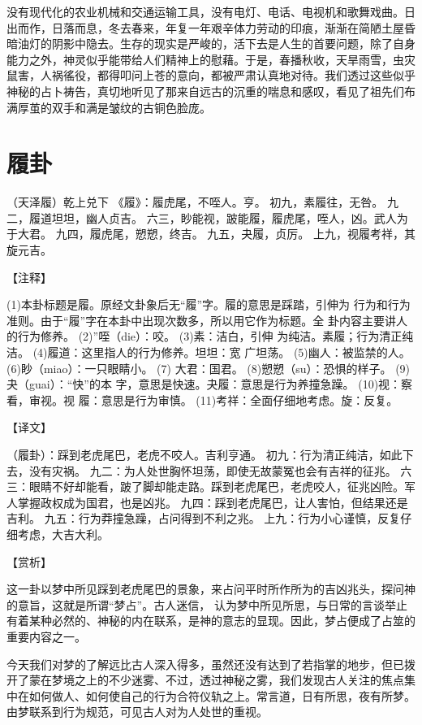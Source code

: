 \documentclass[a4paper,12pt,UTF8,twoside]{ctexbook}
\begin{document}
没有现代化的农业机械和交通运输工具，没有电灯、电话、电视机和歌舞戏曲。日出而作，日落而息，冬去春来，年复一年艰辛体力劳动的印痕，渐渐在简陋土屋昏暗油灯的阴影中隐去。生存的现实是严峻的，活下去是人生的首要问题，除了自身能力之外，神灵似乎能带给人们精神上的慰藉。于是，春播秋收，天旱雨雪，虫灾鼠害，人祸徭役，都得叩问上苍的意向，都被严肃认真地对待。我们透过这些似乎神秘的占卜祷告，真切地听见了那来自远古的沉重的喘息和感叹，看见了祖先们布满厚茧的双手和满是皱纹的古铜色脸庞。

\chapter{履卦}

（天泽履）乾上兑下
《履》：履虎尾，不咥人。亨。
初九，素履往，无咎。
九二，履道坦坦，幽人贞吉。
六三，眇能视，跛能履，履虎尾，咥人，凶。武人为于大君。
九四，履虎尾，愬愬，终吉。
九五，夬履，贞厉。
上九，视履考祥，其旋元吉。

【注释】

(1)本卦标题是履。原经文卦象后无“履”字。履的意思是踩踏，引伸为 行为和行为准则。由于“履”字在本卦中出现次数多，所以用它作为标题。全 卦内容主要讲人的行为修养。
(2)”咥（die）：咬。
(3)素：洁白，引伸 为纯洁。素履；行为清正纯洁。
(4)履道：这里指人的行为修养。坦坦：宽 广坦荡。
(5)幽人：被监禁的人。
(6)眇（miao）：一只眼睛小。
(7) 大君：国君。
(8)愬愬（su）：恐惧的样子。
(9)夬（guai）：“快”的本 字，意思是快速。夬履：意思是行为养撞急躁。
(10)视：察看，审视。视 履：意思是行为审慎。
(11)考祥：全面仔细地考虑。旋：反复。

【译文】

（履卦）：踩到老虎尾巴，老虎不咬人。吉利亨通。
初九：行为清正纯洁，如此下去，没有灾祸。
九二：为人处世胸怀坦荡，即使无故蒙冤也会有吉祥的征兆。
六三：眼睛不好却能看，跛了脚却能走路。踩到老虎尾巴，老虎咬人，征兆凶险。军人掌握政权成为国君，也是凶兆。
九四：踩到老虎尾巴，让人害怕，但结果还是吉利。
九五：行为莽撞急躁，占问得到不利之兆。
上九：行为小心谨慎，反复仔细考虑，大吉大利。

【赏析】

这一卦以梦中所见踩到老虎尾巴的景象，来占问平时所作所为的吉凶兆头，探问神的意旨，这就是所谓“梦占”。古人迷信， 认为梦中所见所思，与日常的言谈举止有着某种必然的、神秘的内在联系，是神的意志的显现。因此，梦占便成了占筮的重要内容之一。

今天我们对梦的了解远比古人深入得多，虽然还没有达到了若指掌的地步，但已拨开了蒙在梦境之上的不少迷雾、不过，透过神秘之雾，我们发现古人关注的焦点集中在如何做人、如何使自己的行为合符仪轨之上。常言道，日有所思，夜有所梦。由梦联系到行为规范，可见古人对为人处世的重视。
\end{document}
